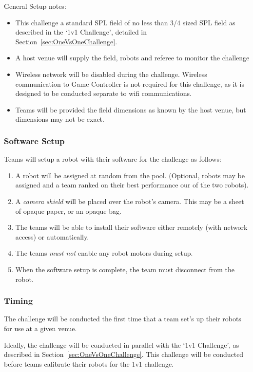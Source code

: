 General Setup notes:
\begin{itemize}
    \item This challenge a standard SPL field of no less than 3/4 sized SPL field as described in the `1v1 Challenge', detailed in Section~\ref{sec:OneVsOneChallenge}.
    \item  A host venue will supply the field, robots and referee to monitor the challenge
    \item  Wireless network will be disabled during the challenge. Wireless communication to Game Controller is not required for this challenge, as it is designed to be conducted separate to wifi communications. 
    \item Teams will be provided the field dimensions as known by the host venue, but dimensions may not be exact.
\end{itemize}

\subsubsection{Software Setup}

Teams will setup a robot with their software for the challenge as follows:
\begin{enumerate}
    \item A robot will be assigned at random from the pool. (Optional,  robots may be assigned and a team ranked on their best performance our of the two robots).
    \item A \textit{camera shield} will be placed over the robot's camera. This may be a sheet of opaque paper, or an opaque bag.
    \item The teams will be able to install their software either remotely (with network access) or automatically.
    \item The teams \textit{must not} enable any robot motors during setup.
    \item When the software setup is complete, the team must disconnect from the robot.
\end{enumerate} 

\subsubsection{Timing}
The challenge will be conducted the first time that a team set's up their robots for use at a given venue.

Ideally, the challenge will be conducted in parallel with the `1v1 Challenge', as described in Section~\ref{sec:OneVsOneChallenge}.
This challenge will be conducted before teams calibrate their robots for the 1v1 challenge.

